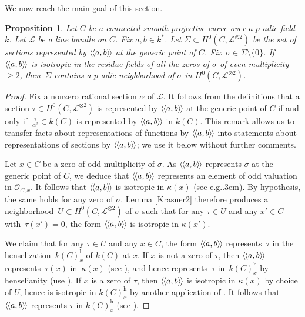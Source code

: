 \documentclass{amsart}
\newtheorem{prop}[thm]{Proposition}
\theoremstyle{definition}
\theoremstyle{remark}
\numberwithin{equation}{section}
\newcommand{\h}{\mathrm{h}}
\newcommand{\llangle}{\langle\kern-.1em\langle}
\newcommand{\rrangle}{\rangle\kern-.1em\rangle}
\def\eg{e.g.\kern.3em}
\def\cL{\mathcal{L}}
\def\cO{\mathcal{O}}
\begin{document}
We now reach the main goal of this section.

\begin{prop}
\label{openness}
Let $C$ be a 
connected smooth projective curve over a $p$-adic field~$k$. Let $\cL$ be a line bundle on $C$. 
Fix $a,b\in k^*$.
Let ${\Sigma\subset H^0(C,\cL^{\otimes 2})}$ be the set of sections represented by $\llangle a,b\rrangle$ at the generic point of $C$. Fix~${\sigma\in \Sigma\setminus\{0\}}$. If~$\llangle a,b\rrangle$ is isotropic in the residue fields of all the zeros of $\sigma$ of even multiplicity~$\geq2$, then~$\Sigma$ contains a $p$-adic neighborhood of $\sigma$ in $H^0(C,\cL^{\otimes 2})$.
\end{prop}

\begin{proof}
Fix a nonzero rational section $\alpha$ of $\cL$. It follows from the definitions that a section $\tau\in H^0(C,\cL^{\otimes 2})$ is represented by $\llangle a,b\rrangle$ at the generic point of $C$ if and only if~$\frac{\tau}{\alpha^2}\in k(C)$ is represented by $\llangle a,b\rrangle$ in $k(C)$. This remark allows us to transfer facts about representations of functions by $\llangle a,b\rrangle$ into statements about representations of sections by $\llangle a,b\rrangle$; we use it below without further comments.

Let $x\in C$ be a zero of odd multiplicity of $\sigma$.
As $\llangle a,b\rrangle$ represents $\sigma$ at the generic point of $C$, we deduce that $\llangle a,b\rrangle$ represents an element of odd valuation in $\cO_{C,x}$. It follows that $\llangle a,b\rrangle$ is isotropic in $\kappa(x)$ (see \eg \cite[Lemma 19.5]{EKM}). 
By hypothesis, the same holds for any zero of $\sigma$. 
Lemma \ref{Krasner2} therefore produces a neighborhood~$U\subset H^0(C,\cL^{\otimes 2})$ of $\sigma$ such that for any $\tau\in U$ and any $x'\in C$ with~$\tau(x')=0$, the form $\llangle a,b\rrangle$ is isotropic in $\kappa(x')$.

 We claim that for any $\tau\in U$ and any $x\in C$, the form $\llangle a,b\rrangle$ represents~$\tau$ in the henselization~$k(C)^{\h}_x$ of $k(C)$ at $x$. If $x$ is not a zero of $\tau$, then $\llangle a,b\rrangle$ represents~$\tau(x)$ in~$\kappa(x)$ (see \cite[I.3.5 and VI.2.12]{Lam}), and hence represents~$\tau$ in~$k(C)^{\h}_x$ by henselianity (use \cite[Lemma~\href{https://stacks.math.columbia.edu/tag/0H74}{0H74}]{SP}). If $x$ is a zero of $\tau$, then $\llangle a,b\rrangle$ is isotropic in $\kappa(x)$ by choice of $U$, hence is isotropic in $k(C)^{\h}_x$ by another application of \cite[Lemma~\href{https://stacks.math.columbia.edu/tag/0H74}{0H74}]{SP}. It follows that $\llangle a,b\rrangle$ represents $\tau$ in $k(C)^{\h}_x$ (see \mbox{\cite[I.3.4]{Lam}}).


\end{proof}
\end{document}
